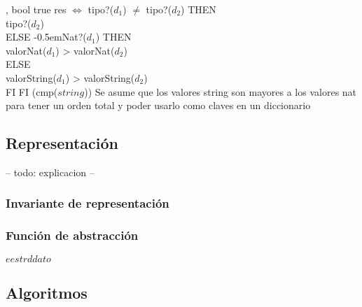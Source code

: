 \operacion{$\bullet > \bullet$}
{, }
{bool}
{true}
{res $\iff$ \IFL tipo?($d_1$) $\neq$ tipo?($d_2$) THEN \\
    \hspace*{10.5em} tipo?($d_2$) \\
    \hspace*{9em} ELSE {\kern-0.5em\IFL Nat?($d_1$) THEN \\
    \hspace*{10.5em} valorNat($d_1$) > valorNat($d_2$) \\
    \hspace*{9em} ELSE \\
    \hspace*{10.5em} valorString($d_1$) > valorString($d_2$) \\
    \hspace*{9em} FI} FI }
{\bigo(cmp($string$))}
{}
{Se asume que los valores string son mayores a los valores nat para tener un orden total y poder usarlo como claves en un diccionario}

\subsection{Representación}

-- todo: explicacion --


\subsubsection{Invariante de representación}


\subsubsection{Función de abstracción}

\begin{ABS}{$e$}{$estr$}{$d$}{$dato$}
\end{ABS}

\subsection{Algoritmos}

